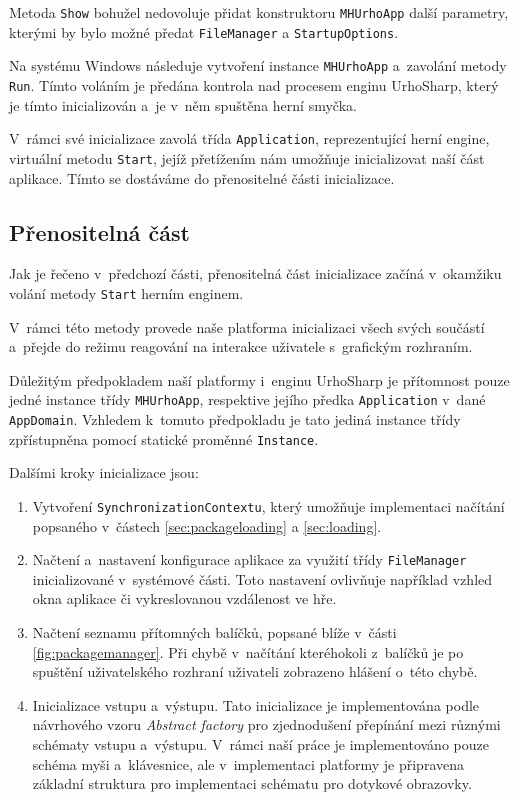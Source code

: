 Metoda \texttt{Show} bohužel nedovoluje přidat konstruktoru \texttt{MHUrhoApp} další parametry, kterými by bylo možné předat \texttt{FileManager} a \texttt{StartupOptions}.

Na systému Windows následuje vytvoření instance \texttt{MHUrhoApp} a~zavolání metody \texttt{Run}. Tímto voláním je předána kontrola nad procesem enginu UrhoSharp, který je tímto inicializován a~je v~něm spuštěna herní smyčka.

V~rámci své inicializace zavolá třída \texttt{Application}, reprezentující herní engine, virtuální metodu \texttt{Start}, jejíž přetížením nám umožňuje inicializovat naší část aplikace. Tímto se dostáváme do přenositelné části inicializace.

\subsection{Přenositelná část}

Jak je řečeno v~předchozí části, přenositelná část inicializace začíná v~okamžiku volání metody \texttt{Start} herním enginem.

V~rámci této metody provede naše platforma inicializaci všech svých součástí a~přejde do režimu reagování na interakce uživatele s~grafickým rozhraním.

Důležitým předpokladem naší platformy i~enginu UrhoSharp je přítomnost pouze jedné instance třídy \texttt{MHUrhoApp}, respektive jejího předka \texttt{Application} v~dané \texttt{AppDomain}. Vzhledem k~tomuto předpokladu je tato jediná instance třídy zpřístupněna pomocí statické proměnné \texttt{Instance}.

Dalšími kroky inicializace jsou:

\begin{enumerate}
	\item Vytvoření \texttt{SynchronizationContextu}, který umožňuje implementaci načítání popsaného v~částech \ref{sec:packageloading} a \ref{sec:loading}.
	\item Načtení a~nastavení konfigurace aplikace za využití třídy \texttt{FileManager} inicializované v~systémové části. Toto nastavení ovlivňuje například vzhled okna aplikace či vykreslovanou vzdálenost ve hře.
	\item Načtení seznamu přítomných balíčků, popsané blíže v~části \ref{fig:packagemanager}. Při chybě v~načítání kteréhokoli z~balíčků je po spuštění uživatelského rozhraní uživateli zobrazeno hlášení o~této chybě.
	\item Inicializace vstupu a~výstupu. Tato inicializace je implementována podle návrhového vzoru \textit{Abstract factory} \citep[str.~87]{book:gangoffour} pro zjednodušení přepínání mezi různými schématy vstupu a~výstupu. V~rámci naší práce je implementováno pouze schéma myši a~klávesnice, ale v~implementaci platformy je připravena základní struktura pro implementaci schématu pro dotykové obrazovky. 
\end{enumerate}

